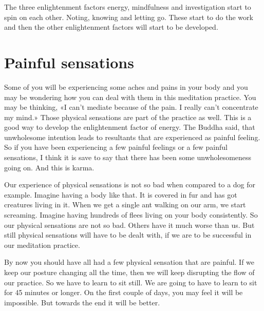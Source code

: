 \documentclass[letterpaper,10pt,english]{sphinxmanual}
\begin{document}
\sphinxAtStartPar
The three enlightenment factors energy, mindfulness and investigation
start to spin on each other. Noting, knowing and letting go. These start to do
the work and then the other enlightenment factors will start to be developed.


\section{Painful sensations}
\label{\detokenize{3-b:painful-sensations}}
\sphinxAtStartPar
Some of you will be experiencing some aches and pains in your body
and  you  may  be  wondering  how  you  can  deal  with  them  in  this  meditation practice. You may be thinking, «I can’t mediate because of the pain. I
really can’t concentrate my mind.» Those physical sensations are part of the
practice as well. This is a good way to develop the enlightenment factor of
energy. The Buddha said, that unwholesome intention leads to resultants that
are experienced as painful feeling. So if you have been experiencing a few
painful feelings or a few painful sensations, I think it is save to say that there
has been some unwholesomeness going on. And this is karma.

\sphinxAtStartPar
Our experience of physical sensations is not so bad when compared to
a dog for example. Imagine having a body like that. It is covered in fur and
has got creatures living in it. When we get a single ant walking on our arm,
we start screaming. Imagine having hundreds of flees living on your body
consistently. So our physical sensations are not so bad. Others have it much
worse than us. But still physical sensations will have to be dealt with, if we
are to be successful in our meditation practice.

\sphinxAtStartPar
By now you should have all had a few physical sensation that are painful. If we keep our posture changing all the time, then we will keep disrupting the flow of our practice. So we have to learn to sit still. We are going to
have to learn to sit for 45 minutes or longer. On the first couple of days, you
may feel it will be impossible. But towards the end it will be better.
\end{document}
